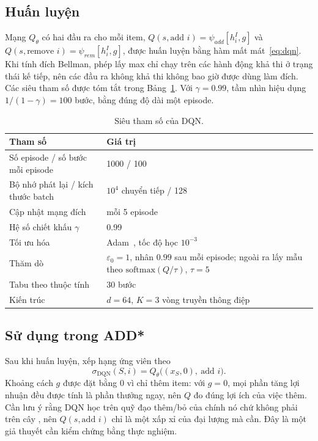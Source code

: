 \subsection{Huấn luyện}

Mạng $Q_\theta$ có hai đầu ra cho mỗi item, $Q(s,\text{add } i)=\psi_{add}[h^I_i,g]$ và $Q(s,\text{remove } i)=\psi_{rem}[h^I_i,g]$, được huấn luyện bằng hàm mất mát~\eqref{eq:dqn}. Khi tính đích Bellman, phép lấy max chỉ chạy trên các hành động khả thi ở trạng thái kế tiếp, nên các đầu ra không khả thi không bao giờ được dùng làm đích. Các siêu tham số được tóm tắt trong Bảng~\ref{tab:dqn_params}. Với $\gamma=0.99$, tầm nhìn hiệu dụng $1/(1-\gamma)=100$ bước, bằng đúng độ dài một episode.

\begin{table}[H]
\centering
\caption{Siêu tham số của DQN.}
\label{tab:dqn_params}
\small
\begin{tabular}{lp{9cm}}
\toprule
\textbf{Tham số} & \textbf{Giá trị}\\
\midrule
Số episode / số bước mỗi episode & 1000 / 100 \\
Bộ nhớ phát lại / kích thước batch & $10^4$ chuyển tiếp / 128 \\
Cập nhật mạng đích & mỗi 5 episode \\
Hệ số chiết khấu $\gamma$ & 0.99 \\
Tối ưu hóa & Adam~\cite{Kingma2015}, tốc độ học $10^{-3}$ \\
Thăm dò & $\varepsilon_0=1$, nhân $0.99$ sau mỗi episode; ngoài ra lấy mẫu theo $\mathrm{softmax}(Q/\tau)$, $\tau=5$ \\
Tabu theo thuộc tính & 30 bước \\
Kiến trúc & $d=64$, $K=3$ vòng truyền thông điệp \\
\bottomrule
\end{tabular}
\end{table}

\subsection{Sử dụng trong ADD*}

Sau khi huấn luyện, \addstar xếp hạng ứng viên theo
\begin{equation}
\sigma_{\text{DQN}}(S,i)=Q_\theta\big((x_S,0),\ \text{add } i\big).
\end{equation}
Khoảng cách $g$ được đặt bằng 0 vì \addstar chỉ thêm item: với $g=0$, mọi phần tăng lợi nhuận đều được tính là phần thưởng ngay, nên $Q$ đo đúng lợi ích của việc thêm. Cần lưu ý rằng DQN học trên quỹ đạo thêm/bỏ của chính nó chứ không phải trên cây \addstar, nên $Q(s,\text{add } i)$ chỉ là một xấp xỉ của đại lượng mà \addstar cần. Đây là một giả thuyết cần kiểm chứng bằng thực nghiệm.

